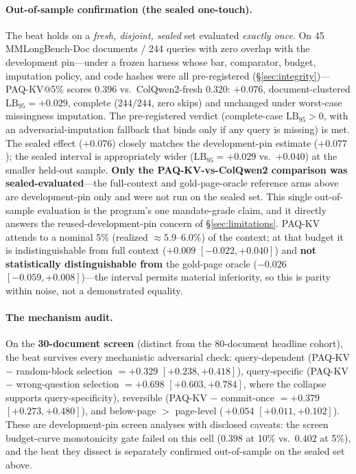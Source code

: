\documentclass[letterpaper]{article} %
\newcommand{\paqc}{\textsc{PAQ-KV}}
\newcommand{\lb}{\mathrm{LB}_{95}}
\begin{document}
\paragraph{Out-of-sample confirmation (the sealed one-touch).} The beat holds on a \emph{fresh, disjoint, sealed} set evaluated \emph{exactly once}. On 45 MMLongBench-Doc documents / 244 queries with zero overlap with the development pin---under a frozen harness whose bar, comparator, budget, imputation policy, and code hashes were all pre-registered (\S\ref{sec:integrity})---\paqc{}@5\% scores $0.396$ vs.\ ColQwen2-fresh $0.320$: $+0.076$, document-clustered $\lb=+0.029$, complete ($244/244$, zero skips) and unchanged under worst-case missingness imputation. The pre-registered verdict (complete-case $\lb>0$, with an adversarial-imputation fallback that binds only if any query is missing) is met. The sealed effect ($+0.076$) closely matches the development-pin estimate ($+0.077$); the sealed interval is appropriately wider ($\lb=+0.029$ vs.\ $+0.040$) at the smaller held-out sample. \textbf{Only the \paqc{}-vs-ColQwen2 comparison was sealed-evaluated}---the full-context and gold-page-oracle reference arms above are development-pin only and were not run on the sealed set. This single out-of-sample evaluation is the program's one mandate-grade claim, and it directly answers the reused-development-pin concern of \S\ref{sec:limitations}. \paqc{} attends to a nominal 5\% (realized ${\approx}5.9$--$6.0\%$) of the context; at that budget it is indistinguishable from full context ($+0.009$ $[-0.022,+0.040]$) and \textbf{not statistically distinguishable from} the gold-page oracle ($-0.026$ $[-0.059,+0.008]$)---the interval permits material inferiority, so this is parity within noise, not a demonstrated equality.

\paragraph{The mechanism audit.} On the \textbf{30-document screen} (distinct from the 80-document headline cohort), the beat survives every mechanistic adversarial check: query-dependent (\paqc{} $-$ random-block selection $= +0.329$ $[+0.238,+0.418]$), query-specific (\paqc{} $-$ wrong-question selection $= +0.698$ $[+0.603,+0.784]$, where the collapse supports query-specificity), reversible (\paqc{} $-$ commit-once $= +0.379$ $[+0.273,+0.480]$), and below-page ${>}$ page-level (\,$+0.054$ $[+0.011,+0.102]$). These are development-pin screen analyses with disclosed caveats: the screen budget-curve monotonicity gate failed on this cell ($0.398$ at 10\% vs.\ $0.402$ at 5\%), and the beat they dissect is separately confirmed out-of-sample on the sealed set above.
\end{document}
